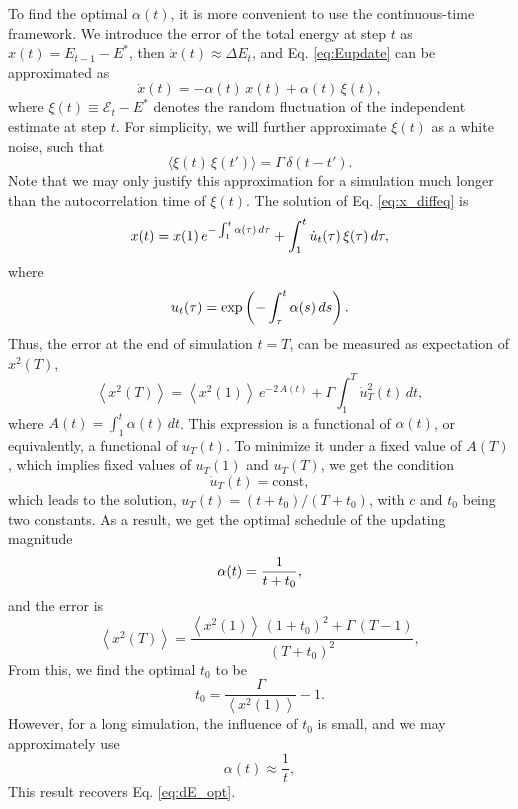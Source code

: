 \documentclass[reprint]{revtex4-1}
\begin{document}
To find the optimal $\alpha(t)$,
it is more convenient to use the continuous-time framework.
%
We introduce the error of the total energy at step $t$ as
$x(t) = E_{t-1} - E^*$,
then $\dot x(t) \approx \Delta E_t$,
and Eq. \eqref{eq:Eupdate} can be approximated as
%
\begin{equation}
  \dot x(t)
  =
  -\alpha(t) \, x(t) + \alpha(t) \, \xi(t)
  ,
  \label{eq:x_diffeq}
\end{equation}
%
where $\xi(t) \equiv \mathcal E_t - E^*$
denotes the random fluctuation of the independent estimate at step $t$.
%
For simplicity, we will further approximate $\xi(t)$ as a white noise,
such that
\begin{equation}
  \langle \xi(t) \, \xi(t') \rangle = \Gamma \, \delta(t - t').
  \label{eq:noise_corr}
\end{equation}
%
Note that we may only justify this approximation
for a simulation much longer than the autocorrelation time of $\xi(t)$.
%
The solution of Eq. \eqref{eq:x_diffeq} is
%
\begin{equation}
  x(t)
  =
  x(1) \, e^{ -\int_1^t \alpha(\tau) \, d\tau }
  +
  \int_1^t \dot u_t(\tau) \, \xi(\tau) \, d\tau
  ,
  \notag
\end{equation}
%
where
\begin{equation}
  u_t(\tau) = \exp\left(
    -\int_\tau^t \alpha(s) \, ds
  \right)
  .
  \notag
\end{equation}
%
Thus, the error at the end of simulation $t = T$,
can be measured as expectation of $x^2(T)$,
%
\begin{equation}
  \left\langle
    x^2(T)
  \right\rangle
  =
  \left\langle
    x^2(1)
  \right\rangle
  \, e^{ -2 \, A(t) }
  +
  \Gamma
  \int_1^T
    \dot u_T^2(t) \, dt
  ,
  \label{eq:err_functional}
\end{equation}
where
$A(t) = \int_1^t \alpha(t) \, dt$.
%
%
This expression is a functional of $\alpha(t)$,
or equivalently, a functional of $u_T(t)$.
%
To minimize it under a fixed value of $A(T)$,
which implies fixed values of $u_T(1)$ and $u_T(T)$,
we get the condition
$$
\dot u_T(t) = \mathrm{const},
$$
which leads to the solution,
$u_T(t) = (t + t_0) / (T + t_0)$,
with $c$ and $t_0$ being two constants.
%
As a result, we get the optimal schedule of the updating magnitude
%
\begin{equation}
  \alpha(t) = \frac{ 1 } { t + t_0 }
  ,
  \notag
\end{equation}
%
and the error is
%
$$%
  \left\langle
    x^2(T)
  \right\rangle
  =
  \frac{
    \left\langle x^2(1) \right\rangle
    \, (1 + t_0)^2
    + \Gamma \, (T - 1)
  }
  {
    (T + t_0)^2
  }
  ,
$$%
%
From this, we find the optimal $t_0$ to be
$$
t_0 = \frac{ \Gamma } { \left\langle x^2(1) \right\rangle } - 1.
$$
%
However, for a long simulation, the influence of $t_0$
is small, and we may approximately use
$$
\alpha(t) \approx \frac 1 t,
$$
This result recovers Eq. \eqref{eq:dE_opt}.
\end{document}
